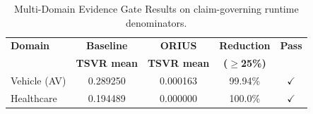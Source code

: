 \begin{table}[htbp]
\centering
\caption{Multi-Domain Evidence Gate Results on claim-governing runtime denominators.}
\label{tbl:multi_domain_evidence_gate}
\begin{tabular}{lcccc}
\toprule
\textbf{Domain} & \textbf{Baseline} & \textbf{ORIUS} & \textbf{Reduction} & \textbf{Pass} \\
& \textbf{TSVR mean} & \textbf{TSVR mean} & \textbf{($\geq$25\%)} & \\
\midrule
Vehicle (AV) & 0.289250 & 0.000163 & 99.94\% & $\checkmark$ \\
Healthcare & 0.194489 & 0.000000 & 100.0\% & $\checkmark$ \\
\bottomrule
\end{tabular}
\end{table}

